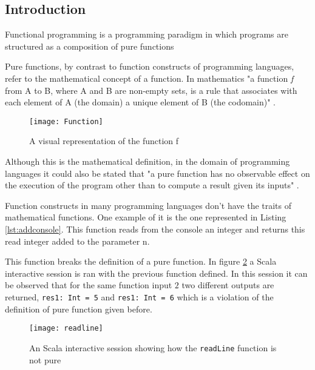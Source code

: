 \documentclass[../main.tex]{subfiles}
\begin{document}
\subsection{Introduction} Functional programming is a programming paradigm in
which programs are structured as a composition of pure functions
\autocite{Hughes1989WhyMatters}

Pure functions, by contrast to function constructs of programming languages,
refer to the mathematical concept of a function. In mathematics "a function \textit{f}
from A to B, where A and B are non-empty sets, is a rule that associates with
each element of A (the domain) a unique element of B (the codomain)"
\autocite{NicholsonTheMathematics}.

\begin{figure}[ht]
  \centering \texttt{[image: Function]}
  \caption{\label{fig:label} A visual representation of the function f}
\end{figure}


Although this is the mathematical definition, in the domain of programming
languages it could also be stated that "a pure function has no observable effect
on the execution of the program other than to compute a result given its inputs"
\autocite{Chiusano2013FunctionalScala}.

Function constructs in many programming languages don't have the
traits of mathematical functions. One example of it is the one represented in
Listing \ref{lst:addconsole}. This function reads from the console an integer
and returns this read integer added to the parameter n.



This function breaks the definition of a pure function. In figure
\ref{fig:readLineN} a Scala interactive session is ran with the previous
function defined. In this session it can be observed that for the same function input
$2$ two different outputs are returned, \texttt{res1: Int = 5} and \texttt{res1:
  Int = 6} which is a violation of the definition of pure function given before.

\begin{figure}[ht]
  \centering \texttt{[image: readline]}
  \caption{\label{fig:readLineN} An Scala interactive session showing how the
    \texttt{readLine} function is not pure}
\end{figure}
\end{document}
